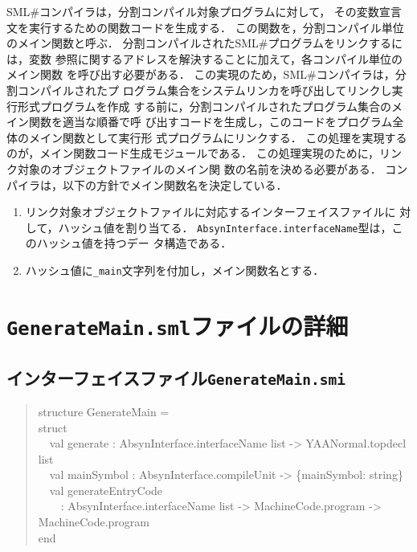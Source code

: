 \documentclass{jbook}
\newif\ifjp
\newcommand{\txt}[2]{#1}
\newcommand{\smlsharp}{SML\#}
\newcommand{\code}[1]{\mbox{\large\tt #1}}
\newcommand{\myem}{\mbox{\ \ }}
\newenvironment{program}{\begin{quote}\begin{tt}}%
                        {\end{tt}\end{quote}}
\begin{document}
	\smlsharp{}コンパイラは，分割コンパイル対象プログラムに対して，
その変数宣言文を実行するための関数コードを生成する．
	この関数を，分割コンパイル単位のメイン関数と呼ぶ．
	分割コンパイルされた\smlsharp{}プログラムをリンクするには，変数
参照に関するアドレスを解決することに加えて，各コンパイル単位のメイン関数
を呼び出す必要がある．
	この実現のため，\smlsharp{}コンパイラは，分割コンパイルされたプ
ログラム集合をシステムリンカを呼び出してリンクし実行形式プログラムを作成
する前に，分割コンパイルされたプログラム集合のメイン関数を適当な順番で呼
び出すコードを生成し，このコードをプログラム全体のメイン関数として実行形
式プログラムにリンクする．
	この処理を実現するのが，メイン関数コード生成モジュールである．
	この処理実現のために，リンク対象のオブジェクトファイルのメイン関
数の名前を決める必要がある．
	コンパイラは，以下の方針でメイン関数名を決定している．
\begin{enumerate}
\item リンク対象オブジェクトファイルに対応するインターフェイスファイルに
対して，ハッシュ値を割り当てる．
	\code{AbsynInterface.interfaceName}型は，このハッシュ値を持つデー
タ構造である．
\item ハッシュ値に\code{\_main}文字列を付加し，メイン関数名とする．
\end{enumerate}

\else%
\fi%
	
\section{\txt{\code{GenerateMain.sml}ファイルの詳細}{The details of \code{GenerateMain.sml}}}
\ifjp%

\subsection{インターフェイスファイル\code{GenerateMain.smi}}
\begin{program}
structure GenerateMain = \\
struct\\
\myem  val generate : AbsynInterface.interfaceName list -> YAANormal.topdecl list\\
\myem  val mainSymbol : AbsynInterface.compileUnit -> \{mainSymbol: string\}\\
\myem  val generateEntryCode\\
\myem\myem    : AbsynInterface.interfaceName list -> MachineCode.program -> MachineCode.program\\
end
\end{program}
\end{document}
